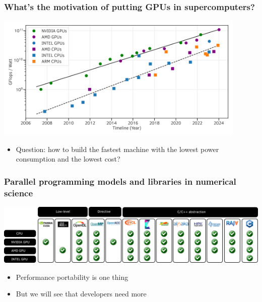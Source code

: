 \documentclass[aspectratio=169]{beamer}
\begin{document}
\begin{frame}
    \frametitle{What's the motivation of putting GPUs in supercomputers?}

\begin{center}
    \includegraphics[width=0.9\textwidth]{../../images/flop_watt_ratio_history_fp64.png}
\end{center}

\begin{itemize}
    \item Question: how to build the fastest machine with the lowest power consumption and the lowest cost?
\end{itemize}

\end{frame}


\begin{frame}
    \frametitle{Parallel programming models and libraries in numerical science}

    \begin{center}
        \includegraphics[width=\textwidth]{../../images/prog_model.png}
    \end{center}

    \begin{itemize}
        \item Performance portability is one thing
        \item But we will see that developers need more
    \end{itemize}

\end{frame}
\end{document}
